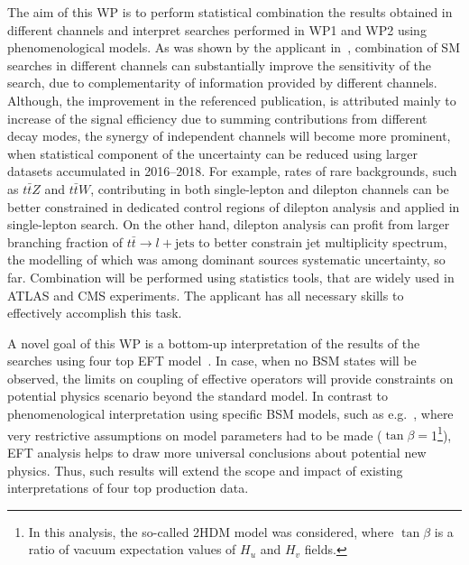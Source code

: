 The aim of this WP is to perform statistical combination the results obtained in different channels and interpret searches performed in WP1 and WP2 using phenomenological models. As was shown by the applicant in~\cite{Sirunyan:2017tep}, combination of SM \tttt searches in different channels can substantially improve the sensitivity of the search, due to complementarity of information provided by different channels. Although, the improvement in the referenced publication, is attributed mainly to increase of the signal efficiency due to summing contributions from different decay modes, the synergy of independent channels will become more prominent, when statistical component of the uncertainty can be reduced using larger datasets accumulated in 2016--2018. For example, rates of rare backgrounds, such as $t\bar{t}Z$ and $t\bar{t}W$, contributing in both single-lepton and dilepton channels can be better constrained in dedicated control regions of dilepton analysis and applied in single-lepton search. On the other hand, dilepton analysis can profit from larger branching fraction of $t\bar{t} \rightarrow l+\mathrm{jets}$ to better constrain jet multiplicity spectrum, the modelling of which was among dominant sources systematic uncertainty, so far. Combination will be performed using statistics tools, that are widely used in ATLAS and CMS experiments. The applicant has all necessary skills to effectively accomplish this task.

A novel goal of this WP is a bottom-up interpretation of the results of the searches using four top EFT model~\cite{DegrandeEFTthesis}. In case, when no BSM states will be observed, the limits on coupling of effective operators will provide constraints on potential physics scenario beyond the standard model. In contrast to phenomenological interpretation using specific BSM models, such as e.g.~\cite{Sirunyan:2017uyt}, where very restrictive assumptions on model parameters had to be made ($\tan \beta=$1\footnote{In this analysis, the so-called 2HDM model was considered, where $\tan \beta$ is a ratio of vacuum expectation values of $H_u$ and $H_v$ fields.}), EFT analysis helps to draw more universal conclusions about potential new physics. Thus, such results will extend the scope and impact of existing interpretations of four top production data. 

